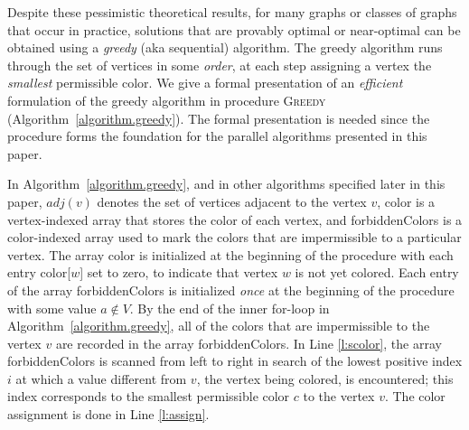 \documentclass{article}
\begin{document}
Despite these pessimistic theoretical results,
for many graphs or classes of graphs that occur in practice, solutions that are provably optimal
or near-optimal can be obtained using a {\em greedy} (aka sequential) algorithm.
The greedy algorithm runs through the set of vertices in some {\em order}, at each step 
assigning a vertex the {\em smallest} permissible color. 
We give a formal presentation of an {\em efficient} formulation of the greedy algorithm
in procedure \textsc{Greedy} (Algorithm~\ref{algorithm.greedy}).
The formal presentation is needed  since the procedure forms the foundation for the 
parallel algorithms presented  in this paper.

In Algorithm~\ref{algorithm.greedy}, and in other algorithms specified later in this paper, 
$\mathit{adj}(v)$ denotes the set of vertices adjacent to the vertex $v$,
\textsf{color} is a vertex-indexed array that stores the color of each vertex,
and \textsf{forbiddenColors} is a color-indexed array used to mark the colors that are 
impermissible to a particular vertex. 
The array \textsf{color} is initialized at the beginning of the procedure with 
each entry \textsf{color}[$w$] set to zero, to indicate that vertex $w$
is not yet colored.
Each entry of the array \textsf{forbiddenColors} is
initialized {\em once} at the beginning of the procedure
with some value $a \notin V$.
By the end of the inner for-loop in Algorithm~\ref{algorithm.greedy},
all of the colors that are impermissible to the vertex $v$ are recorded in the
array \textsf{forbiddenColors}.
In Line \ref{l:scolor}, the array \textsf{forbiddenColors} is scanned from 
left to right in search of the lowest positive index $i$ at which a value different from $v$,
the vertex being colored, is encountered; this index corresponds to the smallest permissible color
$c$ to the vertex $v$. The color assignment is done in Line \ref{l:assign}.
\end{document}
